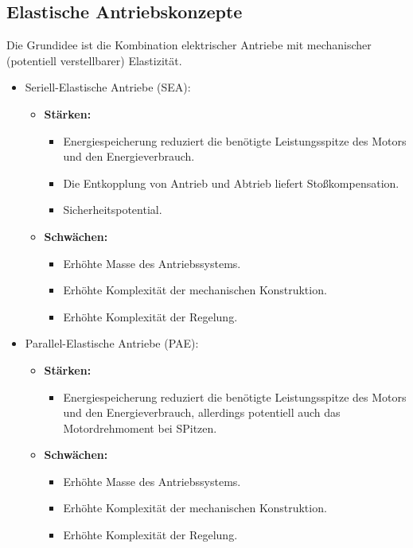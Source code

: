 \documentclass[a4paper, 11pt, accentcolor = tud3b]{tudreport}
\begin{document}
			\subsection{Elastische Antriebskonzepte} %
				Die Grundidee ist die Kombination elektrischer Antriebe mit mechanischer (potentiell verstellbarer) Elastizität.
				
				\begin{itemize}
					\item Seriell-Elastische Antriebe (SEA):
						\begin{itemize}
							\item \textbf{Stärken:}
								\begin{itemize}
									\item Energiespeicherung reduziert die benötigte Leistungsspitze des Motors und den Energieverbrauch.
									\item Die Entkopplung von Antrieb und Abtrieb liefert Stoßkompensation.
									\item Sicherheitspotential.
								\end{itemize}
							\item \textbf{Schwächen:}
								\begin{itemize}
									\item Erhöhte Masse des Antriebssystems.
									\item Erhöhte Komplexität der mechanischen Konstruktion.
									\item Erhöhte Komplexität der Regelung.
								\end{itemize}
						\end{itemize}
					\item Parallel-Elastische Antriebe (PAE):
						\begin{itemize}
							\item \textbf{Stärken:}
								\begin{itemize}
									\item Energiespeicherung reduziert die benötigte Leistungsspitze des Motors und den Energieverbrauch, allerdings potentiell auch das Motordrehmoment bei SPitzen.
								\end{itemize}
							\item \textbf{Schwächen:}
								\begin{itemize}
									\item Erhöhte Masse des Antriebssystems.
									\item Erhöhte Komplexität der mechanischen Konstruktion.
									\item Erhöhte Komplexität der Regelung.
								\end{itemize}
						\end{itemize}
				\end{itemize}
\end{document}
